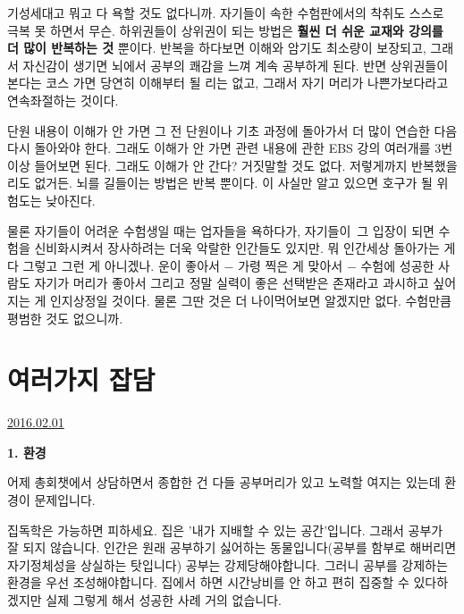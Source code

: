 기성세대고 뭐고 다 욕할 것도 없다니까. 자기들이 속한 수험판에서의 착취도 스스로 극복 못 하면서 무슨.
하위권들이 상위권이 되는 방법은 \textbf{훨씬 더 쉬운 교재와 강의를 더 많이 반복하는 것} 뿐이다.
반복을 하다보면 이해와 암기도 최소량이 보장되고, 그래서 자신감이 생기면 뇌에서 공부의 쾌감을 느껴 계속 공부하게 된다.
반면 상위권들이 본다는 코스 가면 당연히 이해부터 될 리는 없고, 그래서 자기 머리가 나쁜가보다라고 연속좌절하는 것이다.
\vspace{5mm}

단원 내용이 이해가 안 가면 그 전 단원이나 기초 과정에 돌아가서 더 많이 연습한 다음 다시 돌아와야 한다.
그래도 이해가 안 가면 관련 내용에 관한 EBS 강의 여러개를 3번 이상 들어보면 된다.
그래도 이해가 안 간다? 거짓말할 것도 없다. 저렇게까지 반복했을리도 없거든.
뇌를 길들이는 방법은 반복 뿐이다. 이 사실만 알고 있으면 호구가 될 위험도는 낮아진다.
\vspace{5mm}

물론 자기들이 어려운 수험생일 때는 업자들을 욕하다가,
자기들이 그 입장이 되면 수험을 신비화시켜서 장사하려는 더욱 악랄한 인간들도 있지만.
뭐 인간세상 돌아가는 게 다 그렇고 그런 게 아니겠나.
운이 좋아서 $-$ 가령 찍은 게 맞아서 $-$ 수험에 성공한 사람도
자기가 머리가 좋아서 그리고 정말 실력이 좋은 선택받은 존재라고 과시하고 싶어지는 게 인지상정일 것이다.
물론 그딴 것은 더 나이먹어보면 알겠지만 없다.
수험만큼 평범한 것도 없으니까.
\vspace{5mm}




\section{여러가지 잡담}
\href{https://www.kockoc.com/Apoc/619855}{2016.02.01}

\vspace{5mm}

\item \textbf{1. 환경}
\vspace{5mm}

어제 총회챗에서 상담하면서 종합한 건
다들 공부머리가 있고 노력할 여지는 있는데 환경이 문제입니다.
\vspace{5mm}

집독학은 가능하면 피하세요. 집은 '내가 지배할 수 있는 공간'입니다. 그래서 공부가 잘 되지 않습니다.
인간은 원래 공부하기 싫어하는 동물입니다(공부를 함부로 해버리면 자기정체성을 상실하는 탓입니다)
공부는 강제당해야합니다. 그러니 공부를 강제하는 환경을 우선 조성해야합니다.
집에서 하면 시간낭비를 안 하고 편히 집중할 수 있다하겠지만 실제 그렇게 해서 성공한 사례 거의 없습니다.
\vspace{5mm}

